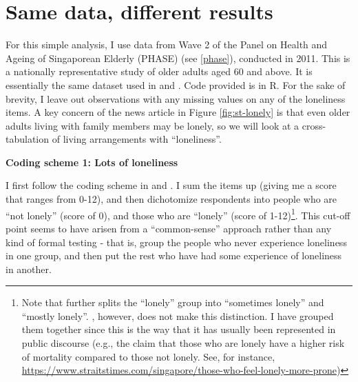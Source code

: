 \documentclass[openany]{book}
\let\rmarkdownfootnote\footnote%
\def\footnote{\protect\rmarkdownfootnote}
\begin{document}
\section{Same data, different
results}\label{same-data-different-results}

For this simple analysis, I use data from Wave 2 of the Panel on Health
and Ageing of Singaporean Elderly (PHASE) (see \ref{phase}), conducted
in 2011. This is a nationally representative study of older adults aged
60 and above. It is essentially the same dataset used in
\citet{lim_association_2017} and \citet{chan_loneliness_2015}. Code
provided is in R. For the sake of brevity, I leave out observations with
any missing values on any of the loneliness items. A key concern of the
news article in Figure \ref{fig:st-lonely} is that even older adults
living with family members may be lonely, so we will look at a
cross-tabulation of living arrangements with ``loneliness''.

\textbf{Coding scheme 1: Lots of loneliness}

I first follow the coding scheme in \citet{lim_association_2017} and
\citet{chan_loneliness_2015}. I sum the items up (giving me a score that
ranges from 0-12), and then dichotomize respondents into people who are
``not lonely'' (score of 0), and those who are ``lonely'' (score of
1-12)\footnote{Note that \citet{chan_loneliness_2015} further splits the
  ``lonely'' group into ``sometimes lonely'' and ``mostly lonely''.
  \citet{lim_association_2017}, however, does not make this distinction.
  I have grouped them together since this is the way that it has usually
  been represented in public discourse (e.g., the claim that those who
  are lonely have a higher risk of mortality compared to those not
  lonely. See, for instance,
  \url{https://www.straitstimes.com/singapore/those-who-feel-lonely-more-prone})}.
This cut-off point seems to have arisen from a ``common-sense'' approach
rather than any kind of formal testing - that is, group the people who
never experience loneliness in one group, and then put the rest who have
had some experience of loneliness in another.
\end{document}
